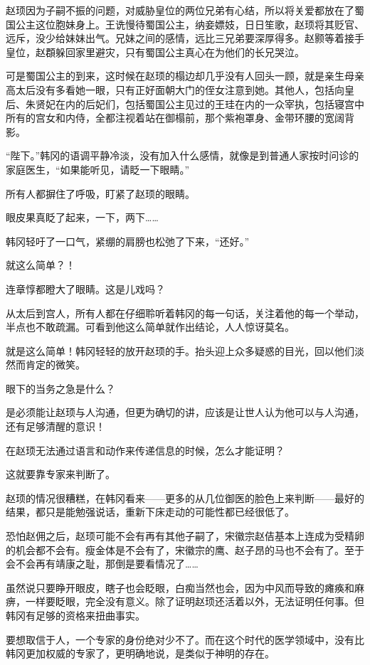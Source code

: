 赵顼因为子嗣不振的问题，对威胁皇位的两位兄弟有心结，所以将关爱都放在了蜀国公主这位胞妹身上。王诜慢待蜀国公主，纳妾嫖妓，日日笙歌，赵顼将其贬官、远斥，没少给妹妹出气。兄妹之间的感情，远比三兄弟要深厚得多。赵颢等着接手皇位，赵頵躲回家里避灾，只有蜀国公主真心在为他们的长兄哭泣。

可是蜀国公主的到来，这时候在赵顼的榻边却几乎没有人回头一顾，就是亲生母亲高太后没有多看她一眼，只有正好面朝大门的侄女注意到她。其他人，包括向皇后、朱贤妃在内的后妃们，包括蜀国公主见过的王珪在内的一众宰执，包括寝宫中所有的宫女和内侍，全都注视着站在御榻前，那个紫袍罩身、金带环腰的宽阔背影。

“陛下。”韩冈的语调平静冷淡，没有加入什么感情，就像是到普通人家按时问诊的家庭医生，“如果能听见，请眨一下眼睛。”

所有人都摒住了呼吸，盯紧了赵顼的眼睛。

眼皮果真眨了起来，一下，两下……

韩冈轻吁了一口气，紧绷的肩膀也松弛了下来，“还好。”

就这么简单？！

连章惇都瞪大了眼睛。这是儿戏吗？

从太后到宫人，所有人都在仔细聆听着韩冈的每一句话，关注着他的每一个举动，半点也不敢疏漏。可看到他这么简单就作出结论，人人惊讶莫名。

就是这么简单！韩冈轻轻的放开赵顼的手。抬头迎上众多疑惑的目光，回以他们淡然而肯定的微笑。

眼下的当务之急是什么？

是必须能让赵顼与人沟通，但更为确切的讲，应该是让世人认为他可以与人沟通，还有足够清醒的意识！

在赵顼无法通过语言和动作来传递信息的时候，怎么才能证明？

这就要靠专家来判断了。

赵顼的情况很糟糕，在韩冈看来——更多的从几位御医的脸色上来判断——最好的结果，都只是能勉强说话，重新下床走动的可能性都已经很低了。

恐怕赵佣之后，赵顼可能不会有再有其他子嗣了，宋徽宗赵佶基本上连成为受精卵的机会都不会有。瘦金体是不会有了，宋徽宗的鹰、赵子昂的马也不会有了。至于会不会再有靖康之耻，那倒是要看情况了……

虽然说只要睁开眼皮，瞎子也会眨眼，白痴当然也会，因为中风而导致的瘫痪和麻痹，一样要眨眼，完全没有意义。除了证明赵顼还活着以外，无法证明任何事。但韩冈有足够的资格来扭曲事实。

要想取信于人，一个专家的身份绝对少不了。而在这个时代的医学领域中，没有比韩冈更加权威的专家了，更明确地说，是类似于神明的存在。

